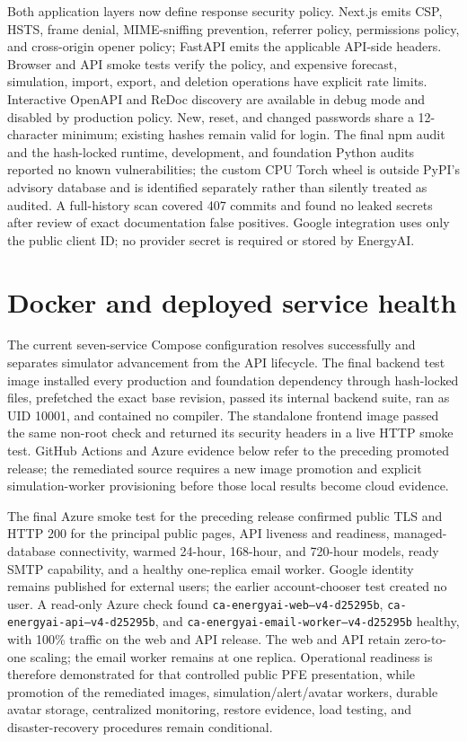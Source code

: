 Both application layers now define response security policy. Next.js emits CSP, HSTS, frame denial, MIME-sniffing prevention, referrer policy, permissions policy, and cross-origin opener policy; FastAPI emits the applicable API-side headers. Browser and API smoke tests verify the policy, and expensive forecast, simulation, import, export, and deletion operations have explicit rate limits. Interactive OpenAPI and ReDoc discovery are available in debug mode and disabled by production policy. New, reset, and changed passwords share a 12-character minimum; existing hashes remain valid for login. The final npm audit and the hash-locked runtime, development, and foundation Python audits reported no known vulnerabilities; the custom CPU Torch wheel is outside PyPI's advisory database and is identified separately rather than silently treated as audited. A full-history scan covered 407 commits and found no leaked secrets after review of exact documentation false positives. Google integration uses only the public client ID; no provider secret is required or stored by EnergyAI.

\section{Docker and deployed service health}

The current seven-service Compose configuration resolves successfully and separates simulator advancement from the API lifecycle. The final backend test image installed every production and foundation dependency through hash-locked files, prefetched the exact base revision, passed its internal backend suite, ran as UID 10001, and contained no compiler. The standalone frontend image passed the same non-root check and returned its security headers in a live HTTP smoke test. GitHub Actions and Azure evidence below refer to the preceding promoted release; the remediated source requires a new image promotion and explicit simulation-worker provisioning before those local results become cloud evidence.

The final Azure smoke test for the preceding release confirmed public TLS and HTTP 200 for the principal public pages, API liveness and readiness, managed-database connectivity, warmed 24-hour, 168-hour, and 720-hour models, ready SMTP capability, and a healthy one-replica email worker. Google identity remains published for external users; the earlier account-chooser test created no user. A read-only Azure check found \texttt{ca-energyai-web--v4-d25295b}, \texttt{ca-energyai-api--v4-d25295b}, and \texttt{ca-energyai-email-worker--v4-d25295b} healthy, with 100\% traffic on the web and API release. The web and API retain zero-to-one scaling; the email worker remains at one replica. Operational readiness is therefore demonstrated for that controlled public PFE presentation, while promotion of the remediated images, simulation/alert/avatar workers, durable avatar storage, centralized monitoring, restore evidence, load testing, and disaster-recovery procedures remain conditional.

